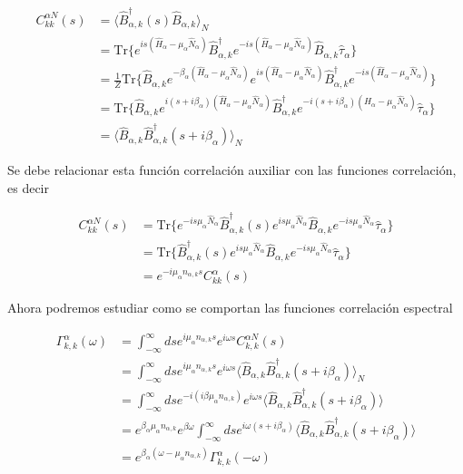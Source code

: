 \begin{appendixs}
\begin{align*}
    C^{\alpha N}_{kk}(s) & =  \langle \hat{B}^{\dagger}_{\alpha,k}(s)\hat{B}_{\alpha,k} \rangle_{N} \\
   &  = \text{Tr}\{e^{is(\hat{H}_{\alpha} - \mu_{\alpha}\hat{N}_{\alpha})}\hat{B}^{\dagger}_{\alpha,k}e^{-is(\hat{H}_{\alpha} - \mu_{\alpha}\hat{N}_{\alpha})}\hat{B}_{\alpha,k}\hat{\tau}_{\alpha}  \} \\
   & = \frac{1}{Z}\text{Tr}\{\hat{B}_{\alpha,k} e^{-\beta_{\alpha}(\hat{H}_{\alpha} - \mu_{\alpha}\hat{N}_{\alpha})} e^{is(\hat{H}_{\alpha} - \mu_{\alpha}\hat{N}_{\alpha})}\hat{B}^{\dagger}_{\alpha,k}e^{-is(\hat{H}_{\alpha} - \mu_{\alpha}\hat{N}_{\alpha})}\} \\
   & = \text{Tr}\{\hat{B}_{\alpha,k}e^{i(s+i\beta_{\alpha})(\hat{H}_{\alpha} - \mu_{\alpha}\hat{N}_{\alpha})}\hat{B}^{\dagger}_{\alpha,k}e^{-i(s+i\beta_{\alpha})(\hat{H}_{\alpha} - \mu_{\alpha}\hat{N}_{\alpha})}\hat{\tau}_{\alpha} \} \\
   & = \langle \hat{B}_{\alpha,k} \hat{B}^{\dagger}_{\alpha,k}(s+i\beta_{\alpha})\rangle_{N} 
\end{align*}

Se debe relacionar esta función correlación auxiliar con las funciones correlación, es decir

\begin{align*}
    C^{\alpha N}_{kk}(s) & = \text{Tr}\{e^{-is\mu_{\alpha}\hat{N}_{\alpha} }\hat{B}^{\dagger}_{\alpha,k}(s)e^{is\mu_{\alpha}\hat{N}_{\alpha}} \hat{B}_{\alpha,k}e^{-is\mu_{\alpha}\hat{N}_{\alpha} }\hat{\tau}_{\alpha}   \} \\
 & = \text{Tr}\{\hat{B}^{\dagger}_{\alpha,k}(s)e^{is\mu_{\alpha}\hat{N}_{\alpha}} \hat{B}_{\alpha,k}e^{-is\mu_{\alpha}\hat{N}_{\alpha}}\hat{\tau}_{\alpha}   \}\\
 & = e^{-i\mu_{\alpha}n_{\alpha,k}s} C^{\alpha}_{kk}(s)
\end{align*}

Ahora podremos estudiar como se comportan las funciones correlación espectral

\begin{align*}
    \Gamma^{\alpha}_{k,k}(\omega) & = \int_{-\infty}^{\infty}ds e^{i\mu_{\alpha}n_{\alpha,k}s} e^{i\omega s}C^{\alpha N}_{k,k}(s) \\
    & = \int_{-\infty}^{\infty}ds e^{i\mu_{\alpha}n_{\alpha,k}s} e^{i\omega s}\langle \hat{B}_{\alpha,k} \hat{B}^{\dagger}_{\alpha,k}(s+i\beta_{\alpha}) \rangle_{N} \\
    & = \int_{-\infty}^{\infty}ds e^{-i(i\beta \mu_{\alpha}n_{\alpha,k})} e^{i\omega s} \langle \hat{B}_{\alpha,k}\hat{B}^{\dagger}_{\alpha,k}(s+i\beta_{\alpha}) \rangle \\
    & = e^{\beta_{\alpha}\mu_{\alpha}n_{\alpha,k}}e^{\beta \omega} \int_{-\infty}^{\infty} ds e^{i\omega(s+i\beta_{\alpha})} \langle \hat{B}_{\alpha,k}\hat{B}^{\dagger}_{\alpha,k}(s+i\beta_{\alpha}) \rangle \\
    & = e^{\beta_{\alpha}(\omega - \mu_{\alpha}n_{\alpha,k})} \Gamma^{\alpha}_{k,k}(-\omega)
\end{align*}



\end{appendixs}

